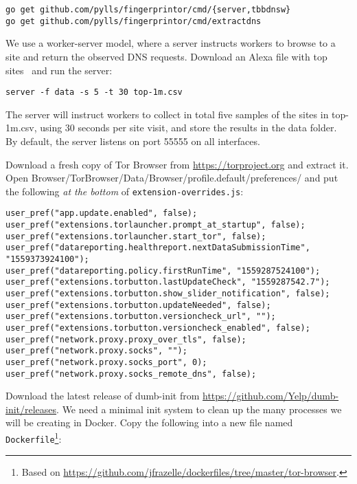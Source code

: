 \documentclass{article}
\begin{document}
\begin{lstlisting}
go get github.com/pylls/fingerprintor/cmd/{server,tbbdnsw}
go get github.com/pylls/fingerprintor/cmd/extractdns
\end{lstlisting}

We use a worker-server model, where a server instructs workers to browse to a
site and return the observed DNS requests. Download an Alexa file with top
sites~\cite{alexatop1k} and run the server:

\begin{lstlisting}
server -f data -s 5 -t 30 top-1m.csv
\end{lstlisting}
The server will instruct workers to collect in total
five samples of the sites in top-1m.csv, using 30 seconds per site visit,
and store the results in the data folder. By default, the server listens on
port 55555 on all interfaces.

Download a fresh copy of Tor Browser from \url{https://torproject.org} and extract it.
Open Browser/TorBrowser/Data/Browser/profile.default/preferences/
and put the
following \emph{at the bottom} of \texttt{extension-overrides.js}:

\begin{lstlisting}
user_pref("app.update.enabled", false);
user_pref("extensions.torlauncher.prompt_at_startup", false);
user_pref("extensions.torlauncher.start_tor", false);
user_pref("datareporting.healthreport.nextDataSubmissionTime", "1559373924100");
user_pref("datareporting.policy.firstRunTime", "1559287524100");
user_pref("extensions.torbutton.lastUpdateCheck", "1559287542.7");
user_pref("extensions.torbutton.show_slider_notification", false);
user_pref("extensions.torbutton.updateNeeded", false);
user_pref("extensions.torbutton.versioncheck_url", "");
user_pref("extensions.torbutton.versioncheck_enabled", false);
user_pref("network.proxy.proxy_over_tls", false);
user_pref("network.proxy.socks", "");
user_pref("network.proxy.socks_port", 0);
user_pref("network.proxy.socks_remote_dns", false);
\end{lstlisting}

Download the latest release of dumb-init from
\url{https://github.com/Yelp/dumb-init/releases}. We need a minimal init system
to clean up the many processes we will be creating in Docker.
Copy the following into a
new file named \texttt{Dockerfile}\footnote{Based on
\url{https://github.com/jfrazelle/dockerfiles/tree/master/tor-browser}.}:
\end{document}
